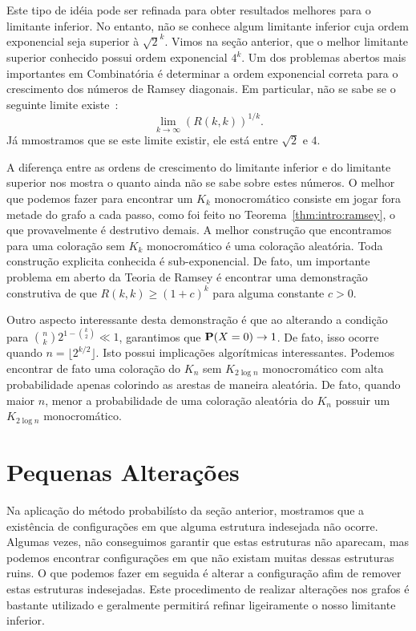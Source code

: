 Este tipo de idéia pode ser refinada para obter resultados melhores para o limitante inferior. No entanto, não se conhece algum limitante inferior cuja ordem exponencial seja superior à $\sqrt{2}^k$. Vimos na seção anterior, que o melhor limitante superior conhecido possui ordem exponencial $4^k$. Um dos problemas abertos mais importantes em Combinatória é determinar a ordem exponencial correta para o crescimento dos números de Ramsey diagonais. Em particular, não se sabe se o seguinte limite existe~\cite{chung1983survey}:
\[ \lim_{k \to \infty} \left(R(k,k)  \right)^{1/k}. \]
Já mmostramos que se este limite existir, ele está entre $\sqrt{2}$ e $4$.

A diferença entre as ordens de crescimento do limitante inferior e do limitante superior nos mostra o quanto ainda não se sabe sobre estes números. O melhor que podemos fazer para encontrar um $K_k$ monocromático consiste em jogar fora metade do grafo a cada passo, como foi feito no Teorema~\ref{thm:intro:ramsey}, o que provavelmente é destrutivo demais. A melhor construção que encontramos para uma coloração sem $K_k$ monocromático é uma coloração aleatória. Toda construção explicita conhecida é sub-exponencial. De fato, um importante problema em aberto da Teoria de Ramsey é encontrar uma demonstração construtiva de que $R(k,k) \geq (1+c)^k$ para alguma constante $c > 0$.

Outro aspecto interessante desta demonstração é que ao alterando a condição para $\binom{n}{k} 2^{1 - \binom{k}{2}} \ll 1$, garantimos que $\operatorname{\mathbf{P}}(X = 0) \to 1$. De fato, isso ocorre quando $n = \lfloor 2^{k/2} \rfloor$. Isto possui implicações algorítmicas interessantes. Podemos encontrar de fato uma coloração do $K_n$ sem $K_{2\log n}$ monocromático com alta probabilidade apenas colorindo as arestas de maneira aleatória. De fato, quando maior $n$, menor a probabilidade de uma coloração aleatória do $K_n$ possuir um $K_{2\log n}$ monocromático.


\section{Pequenas Alterações}

Na aplicação do método probabilísto da seção anterior, mostramos que a existência de configurações em que alguma estrutura indesejada não ocorre. Algumas vezes, não conseguimos garantir que estas estruturas não aparecam, mas podemos encontrar configurações em que não existam muitas dessas estruturas ruins. O que podemos fazer em seguida é alterar a configuração afim de remover estas estruturas indesejadas. Este procedimento de realizar alterações nos grafos é bastante utilizado e geralmente permitirá refinar ligeiramente o nosso limitante inferior.

